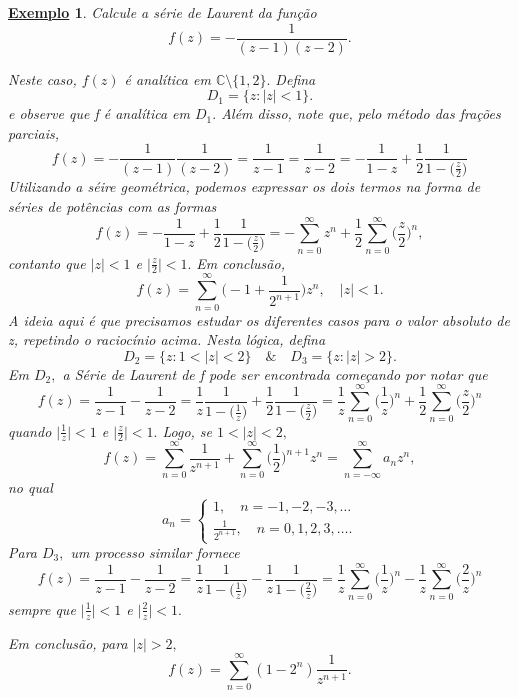 \documentclass{article}
\newtheorem{example}{\underline{Exemplo}}[section]
\begin{document}
  \begin{example}
    Calcule a série de Laurent da função 
    \[
      f(z) = -\frac{1}{(z-1)(z-2)}.
    \]

    Neste caso, \(f(z)\) é analítica em \(\mathbb{C}\setminus{\{1, 2\}}.\) Defina 
    \[
      D_{1} = \{z:|z| < 1\}.
    \]
    e observe que f é analítica em \(D_{1}.\) Além disso, note que, pelo método das frações parciais,
    \[
      f(z) = -\frac{1}{(z-1)}\frac{1}{(z-2)} = \frac{1}{z-1} = \frac{1}{z-2} = -\frac{1}{1-z} + \frac{1}{2}\frac{1}{1-\bigl(\frac{z}{2}\bigr)}
    \]
    Utilizando a séire geométrica, podemos expressar os dois termos na forma de séries de potências com as formas 
    \[
      f(z) = -\frac{1}{1-z} + \frac{1}{2}\frac{1}{1-\bigl(\frac{z}{2}\bigr)} = -\sum\limits_{n=0}^{\infty}z^{n} + \frac{1}{2}\sum\limits_{n=0}^{\infty}\biggl(\frac{z}{2}\biggr)^{n},
    \]
    contanto que \(|z| < 1\) e \(\biggl\vert \frac{z}{2}\biggr\vert < 1.\) Em conclusão, 
    \[
      f(z) = \sum\limits_{n=0}^{\infty}\biggl(-1 + \frac{1}{2^{n+1}}\biggr)z^{n},\quad |z|<1.
    \]
    A ideia aqui é que precisamos estudar os diferentes casos para o valor absoluto de z, repetindo o raciocínio acima. Nesta lógica, defina 
    \[
      D_{2} = \{z: 1 < |z| < 2\}\quad\&\quad D_{3} = \{z: |z| > 2\}.
    \]
    Em \(D_{2},\) a Série de Laurent de f pode ser encontrada começando por notar que 
    \[
      f(z) = \frac{1}{z-1} - \frac{1}{z-2} = \frac{1}{z}\frac{1}{1-\bigl(\frac{1}{z}\bigr)} + \frac{1}{2}\frac{1}{1-\bigl(\frac{z}{2}\bigr)} = \frac{1}{z}\sum\limits_{n=0}^{\infty}\biggl(\frac{1}{z}\biggr)^{n} + \frac{1}{2}\sum\limits_{n=0}^{\infty}\biggl(\frac{z}{2}\biggr)^{n}
    \]
    quando \(\biggl\vert\frac{1}{z}\biggr\vert < 1\) e \(\biggl\vert \frac{z}{2}\biggr\vert < 1.\) Logo, se \(1 < |z| < 2,\)
    \[
      f(z) = \sum\limits_{n=0}^{\infty}\frac{1}{z^{n+1}} + \sum\limits_{n=0}^{\infty}\biggl(\frac{1}{2}\biggr)^{n+1}z^{n} = \sum\limits_{n=-\infty}^{\infty}a_{n}z^{n},
    \]
    no qual 
    \[
      a_{n} = \left\{\begin{array}{ll}
          1,\quad n = -1, -2, -3, \dotsc \\
          \frac{1}{2^{n+1}},\quad n=0, 1, 2, 3,\dotsc .
      \end{array}\right.
    \]
    Para \(D_{3},\) um processo similar fornece 
    \[
      f(z) = \frac{1}{z-1} - \frac{1}{z-2} = \frac{1}{z}\frac{1}{1-\bigl(\frac{1}{z}\bigr)} - \frac{1}{z}\frac{1}{1-\bigl(\frac{2}{z}\bigr)} = \frac{1}{z}\sum\limits_{n=0}^{\infty}\biggl(\frac{1}{z}\biggr)^{n} - \frac{1}{z}\sum\limits_{n=0}^{\infty}\biggl(\frac{2}{z}\biggr)^{n}
    \]
    sempre que \(\biggl\vert\frac{1}{z}\biggr\vert < 1\) e \(\biggl\vert \frac{2}{z}\biggr\vert < 1.\) 

    Em conclusão, para \(|z| > 2,\) 
    \[
      f(z) = \sum\limits_{n=0}^{\infty}(1-2^{n})\frac{1}{z^{n+1}}.
    \]
  \end{example}
\end{document}

